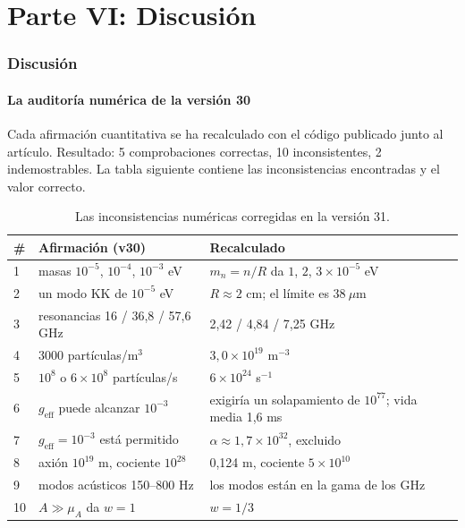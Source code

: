 \documentclass[11pt,a4paper]{article}
\begin{document}
\newpage
\part*{Parte VI: Discusión}

\section{Discusión}
\subsection{La auditoría numérica de la versión 30}
Cada afirmación cuantitativa se ha recalculado con el código publicado junto al artículo. Resultado: 5 comprobaciones correctas, 10 inconsistentes, 2 indemostrables. La tabla siguiente contiene las inconsistencias encontradas y el valor correcto.

\begin{table}[H]
\centering
\small
\begin{tabular}{@{}p{0.5cm}p{6.2cm}p{5.2cm}@{}}
\toprule
\# & \textbf{Afirmación (v30)} & \textbf{Recalculado} \\ \midrule
1 & masas $10^{-5}$, $10^{-4}$, $10^{-3}$ eV & $m_n = n/R$ da $1$, $2$, $3 \times 10^{-5}$ eV \\
2 & un modo KK de $10^{-5}$ eV & $R \approx 2$ cm; el límite es $38\ \mu$m \\
3 & resonancias 16 / 36,8 / 57,6 GHz & 2,42 / 4,84 / 7,25 GHz \\
4 & 3000 partículas/m$^3$ & $3,0\times10^{19}$ m$^{-3}$ \\
5 & $10^8$ o $6\times10^8$ partículas/s & $6\times10^{24}$ s$^{-1}$ \\
6 & $g_{\text{eff}}$ puede alcanzar $10^{-3}$ & exigiría un solapamiento de $10^{77}$; vida media 1,6 ms \\
7 & $g_{\text{eff}} = 10^{-3}$ está permitido & $\alpha \approx 1,7\times10^{32}$, excluido \\
8 & axión $10^{19}$ m, cociente $10^{28}$ & 0,124 m, cociente $5\times10^{10}$ \\
9 & modos acústicos 150--800 Hz & los modos están en la gama de los GHz \\
10 & $A \gg \mu_A$ da $w = 1$ & $w = 1/3$ \\ \bottomrule
\end{tabular}
\caption{Las inconsistencias numéricas corregidas en la versión 31.}
\label{tab:audit}
\end{table}
\end{document}
